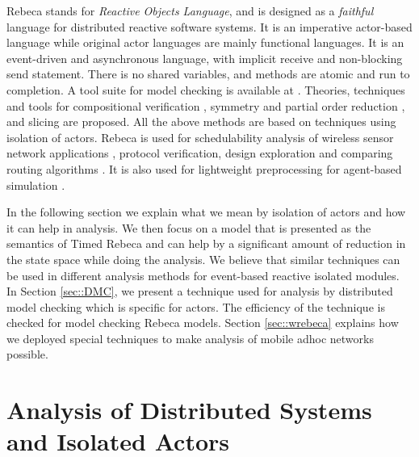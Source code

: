 
Rebeca stands for \textit{Reactive Objects Language}, and is designed as a \textit{faithful} language for  distributed reactive software systems.
It is an imperative actor-based language while original actor languages are mainly functional languages. It is an event-driven and asynchronous language, with implicit receive and non-blocking send statement. There is no shared variables, and methods are atomic and run to completion.
A  tool suite for model checking is available at \cite{RebecaSite}. Theories, techniques and tools for compositional verification \cite{DBLP:journals/jucs/SirjaniMSB05}, symmetry and partial order reduction \cite{DBLP:journals/acta/JaghooriSMKM10}, and slicing \cite{DBLP:journals/scp/SabouriS10}  are proposed. All the above methods are based on techniques using isolation of actors.
Rebeca is used for schedulability analysis of wireless sensor network applications \cite{DBLP:journals/sttt/KhamespanahSMA18}, protocol verification\cite{FOAC}, design exploration  and comparing routing algorithms \cite{DBLP:journals/eceasst/sharifiMMS13}. It is also used for lightweight preprocessing for agent-based simulation \cite{DBLP:journals/scp/BerardinisFJS18}. 


In the following section we explain what we mean by isolation of actors and how it can help in analysis. We then focus on a model %
that is presented as the semantics of Timed Rebeca and can help by a significant amount of reduction in the state space while doing the analysis. We believe that similar techniques can be used in different analysis methods for event-based reactive isolated modules. 
%
In Section \ref{sec::DMC}, we present a technique used for analysis by distributed model checking which is specific for actors. The efficiency of the technique is checked for model checking Rebeca models.
%
Section \ref{sec::wrebeca} explains how we deployed special techniques to make analysis of  mobile adhoc networks possible.

\section{Analysis of Distributed Systems and Isolated Actors}


